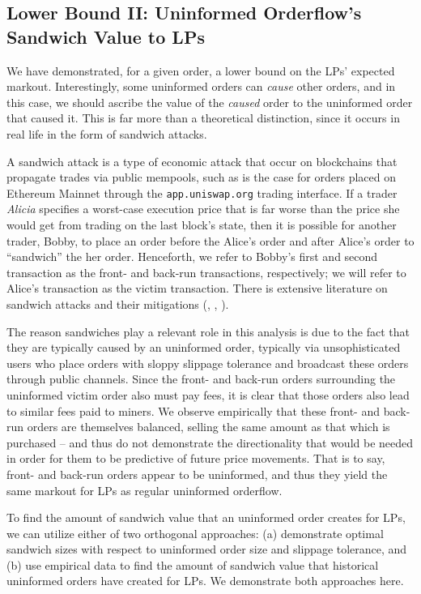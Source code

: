 \subsection{Lower Bound II: Uninformed Orderflow's Sandwich Value to LPs} \label{subsection:sandwich-value-to-lps}
    We have demonstrated, for a given order, a lower bound on the LPs' expected markout. Interestingly, some uninformed orders can \textit{cause} other orders, and in this case, we should ascribe the value of the \textit{caused} order to the uninformed order that caused it. This is far more than a theoretical distinction, since it occurs in real life in the form of sandwich attacks.

    A sandwich attack is a type of economic attack that occur on blockchains that propagate trades via public mempools, such as is the case for orders placed on Ethereum Mainnet through the \texttt{app.uniswap.org} trading interface. If a trader \textit{Alicia} specifies a worst-case execution price that is far worse than the price she would get from trading on the last block's state, then it is possible for another trader, Bobby, to place an order before the Alice's order and after Alice's order  to ``sandwich'' the her order. Henceforth, we refer to Bobby's first and second transaction as the front- and back-run transactions, respectively; we will refer to Alice's transaction as the victim transaction. There is extensive literature on sandwich attacks and their mitigations (\cite{kulkarni2022towards}, \cite{zust2021analyzing}, \cite{zhou2021high}).
    
    The reason sandwiches play a relevant role in this analysis is due to the fact that they are typically caused by an uninformed order, typically via unsophisticated users who place orders with sloppy slippage tolerance and broadcast these orders through public channels. Since the front- and back-run orders surrounding the uninformed victim order also must pay fees, it is clear that those orders also lead to similar fees paid to miners. We observe empirically that these front- and back-run orders are themselves balanced, selling the same amount as that which is purchased -- and thus do not demonstrate the directionality that would be needed in order for them to be predictive of future price movements. That is to say, front- and back-run orders appear to be uninformed, and thus they yield the same markout for LPs as regular uninformed orderflow.

    To find the amount of sandwich value that an uninformed order creates for LPs, we can utilize either of two orthogonal approaches: (a) demonstrate optimal sandwich sizes with respect to uninformed order size and slippage tolerance, and (b) use empirical data to find the amount of sandwich value that historical uninformed orders have created for LPs. We demonstrate both approaches here.


